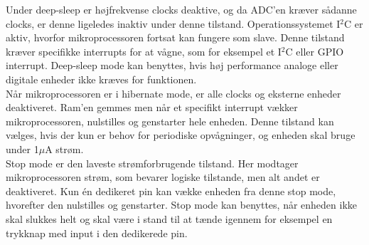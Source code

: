 Under deep-sleep er højfrekvense clocks deaktive, og da ADC'en kræver sådanne clocks, er denne ligeledes inaktiv under denne tilstand. Operationssystemet I$^{2}$C er aktiv, hvorfor mikroprocessoren fortsat kan fungere som slave. Denne tilstand kræver specifikke interrupts for at vågne, som for eksempel et I$^{2}$C eller GPIO interrupt. Deep-sleep mode kan benyttes, hvis høj performance analoge eller digitale enheder ikke kræves for funktionen. \citep{Semiconductor2016PowerMode} \\
Når mikroprocessoren er i hibernate mode, er alle clocks og eksterne enheder deaktiveret. Ram'en gemmes men når et specifikt interrupt vækker mikroprocessoren, nulstilles og genstarter hele enheden. Denne tilstand kan vælges, hvis der kun er behov for periodiske opvågninger, og enheden skal bruge under 1$\mu$A strøm. \citep{Semiconductor2016PowerMode} \\
Stop mode er den laveste strømforbrugende tilstand. Her modtager mikroprocessoren strøm, som bevarer logiske tilstande, men alt andet er deaktiveret. Kun én dedikeret pin kan vække enheden fra denne stop mode, hvorefter den nulstilles og genstarter. Stop mode kan benyttes, når enheden ikke skal slukkes helt og skal være i stand til at tænde igennem for eksempel en trykknap med input i den dedikerede pin. \citep{Semiconductor2016PowerMode}
